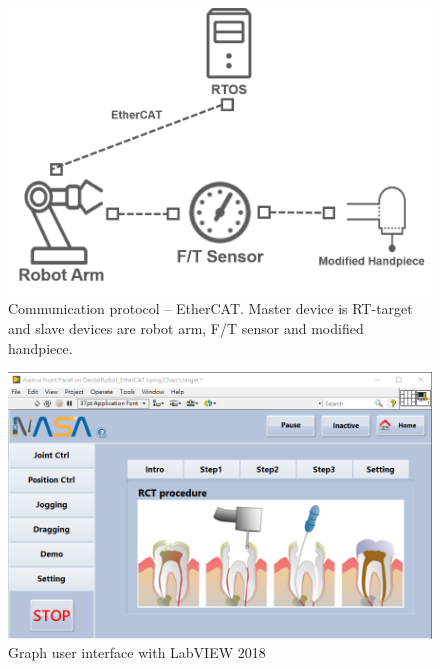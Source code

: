 \begin{figure}[htbp]
\begin{center}
\includegraphics[width=0.7\linewidth]{Images/EtherCAT.png}
\caption{Communication protocol -- EtherCAT. Master device is RT-target and slave devices are robot arm, F/T sensor and modified handpiece.}
\end{center}
\end{figure}
\label{fig:EtherCAT}
\begin{figure}[htbp]
\begin{center}
\includegraphics[width=1\linewidth]{Images/GUI.png}
\caption{Graph user interface with LabVIEW 2018}
\label{fig:GUI}
\end{center}
\end{figure}
